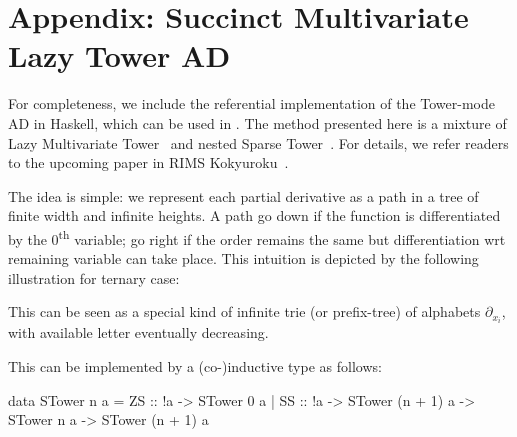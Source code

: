 \documentclass[%
  sigconf,authorversion,screen]{acmart}
\begin{document}
\section*{Appendix: Succinct Multivariate Lazy Tower AD}
For completeness, we include the referential implementation of the Tower-mode AD in Haskell, which can be used in .
The method presented here is a mixture of Lazy Multivariate Tower~\cite{Pearlmutter:2007aa} and nested Sparse Tower~\cite{Kmett:2010aa}.
For details, we refer readers to the upcoming paper in RIMS Kokyuroku~\cite{Ishii:2021ab}.

The idea is simple: we represent each partial derivative as a path in a tree of finite width and infinite heights.
A path go down if the function is differentiated by the 0\textsuperscript{th} variable; go right if the order remains the same but differentiation wrt remaining variable can take place.
This intuition is depicted by the following illustration for ternary case:

\begin{center}
\end{center}

This can be seen as a special kind of infinite trie (or prefix-tree) of alphabets $\partial_{x_i}$, with available letter eventually decreasing.

This can be implemented by a (co-)inductive type as follows:

\begin{code}
data STower n a
  = ZS :: !a -> STower 0 a
  | SS :: !a
       -> STower (n + 1) a
       -> STower n a
       -> STower (n + 1) a
\end{code}
\end{document}
